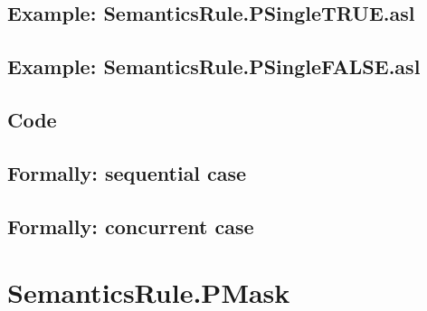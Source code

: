 \documentclass{book}
\begin{document}
    \subsection{Example: SemanticsRule.PSingleTRUE.asl}

    \subsection{Example: SemanticsRule.PSingleFALSE.asl}

  \subsection{Code}

\begin{emptyformal}
  \subsection{Formally: sequential case}

  \subsection{Formally: concurrent case}
\end{emptyformal}


\section{SemanticsRule.PMask \label{sec:SemanticsRule.PMask}}
\end{document}
